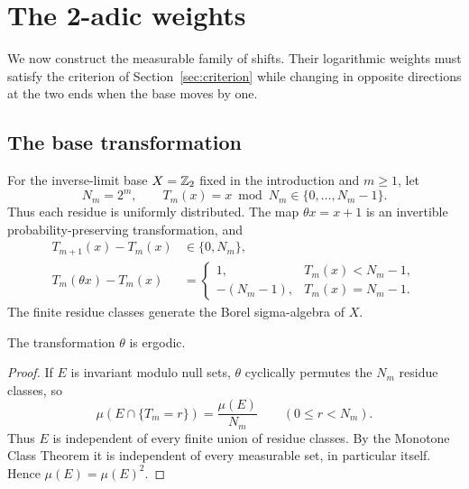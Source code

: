 \section{The 2-adic weights}\label{sec:fibers}
We now construct the measurable family of shifts. Their logarithmic weights must satisfy the criterion of Section~\ref{sec:criterion} while changing in opposite directions at the two ends when the base moves by one.

\subsection{The base transformation}
For the inverse-limit base $X=\mathbb Z_2$ fixed in the introduction and $m\ge1$, let
\[
 N_m=2^m,\qquad T_m(x)=x\bmod N_m\in\{0,\ldots,N_m-1\}.
\]
Thus each residue is uniformly distributed. The map $\theta x=x+1$ is an invertible probability-preserving transformation, and
\begin{align}
 T_{m+1}(x)-T_m(x)&\in\{0,N_m\},\label{eq:residue-nesting}\\
 T_m(\theta x)-T_m(x)&=
 \begin{cases}1,&T_m(x)<N_m-1,\\-(N_m-1),&T_m(x)=N_m-1.\end{cases}\label{eq:residue-step}
\end{align}
The finite residue classes generate the Borel sigma-algebra of $X$.

\begin{lemma}\label{lem:ergodicity}
The transformation $\theta$ is ergodic.
\end{lemma}
\begin{proof}
If $E$ is invariant modulo null sets, $\theta$ cyclically permutes the $N_m$ residue classes, so
\[
 \mu(E\cap\{T_m=r\})=\frac{\mu(E)}{N_m}\qquad(0\le r<N_m).
\]
Thus $E$ is independent of every finite union of residue classes. By the Monotone Class Theorem it is independent of every measurable set, in particular itself. Hence $\mu(E)=\mu(E)^2$.
\end{proof}

